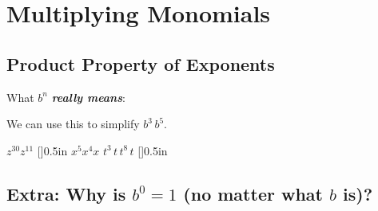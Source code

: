 \section{Multiplying Monomials}
\subsection{Product Property of Exponents}


What $b^n$ {\bfseries\itshape really means}:
\vspace*{1.25in}

We can use this to simplify $b^3\,b^5$.
\vspace*{4in}

    {
        $ z^{30} z^{11} $
    }
    [\normalsize]{0.5in}
\myProblems
    {
        $ x^5 x^4 x $
    }
    {
        $ t^3 \, t \, t^{8} \, t $
    }
    [\normalsize]{0.5in}

\subsection{Extra: Why is $b^0=1$ (no matter what $b$ is)?}
\vspace*{4in}
